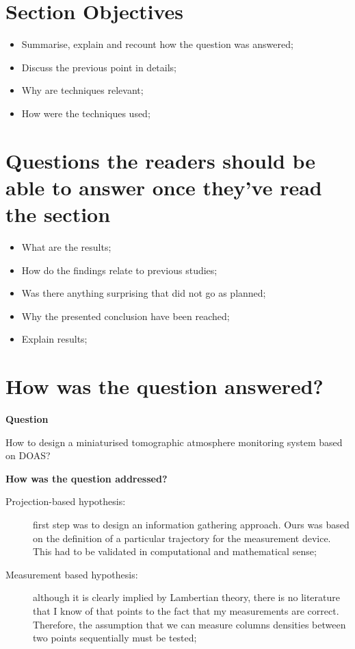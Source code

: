 

\section{Section Objectives}%
\label{sec:section_objectives}

\begin{itemize}
    \item Summarise, explain and recount how the question was answered;
    \item Discuss the previous point in details;
    \item Why are techniques relevant;
    \item How were the techniques used;
\end{itemize}

\section{Questions the readers should be able to answer once they've
read the section}%
\label{sec:questions_the_readers_should_be_able_to_answer_once_they_ve_read_the_section}
\begin{itemize}
    \item What are the results;
    \item How do the findings relate to previous studies;
    \item Was there anything surprising that did not go as planned;
    \item Why the presented conclusion have been reached;
    \item Explain results;
\end{itemize}


\section{How was the question answered?}%
\label{sec:how_was_the_question_answered_}
\textbf{Question}

How to design a miniaturised tomographic atmosphere monitoring system
based on DOAS?

\textbf{How was the question addressed?}

\begin{description}
    \item[Projection-based hypothesis:]first step was to design an
        information gathering approach. Ours was based on the definition
        of a particular trajectory for the measurement device. This had
        to be validated in computational and mathematical sense;
    \item[Measurement based hypothesis:] although it is clearly implied
        by Lambertian theory, there is no literature that I know of that
        points to the fact that my measurements are correct. Therefore,
        the assumption that we can measure columns densities between two
        points sequentially must be tested;
\end{description}

